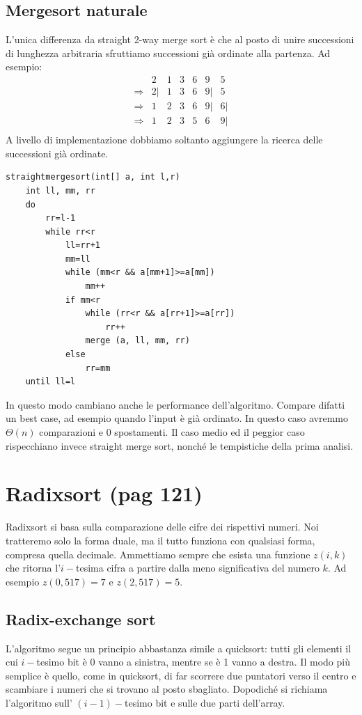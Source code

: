 \documentclass[a4paper]{book}
\newcommand{\lstIndent}{4}
\begin{document}
\subsection*{Mergesort naturale}
L'unica differenza da straight 2-way merge sort è che al posto di unire successioni di lunghezza arbitraria sfruttiamo successioni già ordinate alla partenza. Ad esempio:
\[\begin{array}{*{20}{c}}
{}&{2}&1&{3}&{6}&9&5\\
{\Rightarrow}&{2|}&{1}&{3}&{6}&{9|}&{5}\\
{\Rightarrow}&1&{2}&{3}&{6}&{9|}&{6|}\\
{\Rightarrow}&1&{2}&{3}&5&{6}&{9|}\\
\end{array}\]
A livello di implementazione dobbiamo soltanto aggiungere la ricerca delle successioni già ordinate.
\begin{lstlisting}[tabsize=\lstIndent]
straightmergesort(int[] a, int l,r)
	int ll, mm, rr
	do
		rr=l-1
		while rr<r
			ll=rr+1
			mm=ll	
			while (mm<r && a[mm+1]>=a[mm])
				mm++
			if mm<r
				while (rr<r && a[rr+1]>=a[rr])
					rr++
				merge (a, ll, mm, rr)
			else
				rr=mm
	until ll=l								
\end{lstlisting}
In questo modo cambiano anche le performance dell'algoritmo. Compare difatti un best case, ad esempio quando l'input è già ordinato. In questo caso avremmo $\Theta (n)$ comparazioni e 0 spostamenti. Il caso medio ed il peggior caso rispecchiano invece straight merge sort, nonché le tempistiche della prima analisi.
\section{Radixsort (pag 121)}
Radixsort si basa sulla comparazione delle cifre dei rispettivi numeri. Noi tratteremo solo la forma duale, ma il tutto funziona con qualsiasi forma, compresa quella decimale. Ammettiamo sempre che esista una funzione $z(i,k)$ che ritorna l'$i-$tesima cifra a partire dalla meno significativa del numero $k$. Ad esempio $z(0,517)=7$ e $z(2, 517)=5$.
\subsection{Radix-exchange sort}
L'algoritmo segue un principio abbastanza simile a quicksort: tutti gli elementi il cui $i-$tesimo bit è 0 vanno a sinistra, mentre se è 1 vanno a destra. Il modo più semplice è quello, come in quicksort, di far scorrere due puntatori verso il centro e scambiare i numeri che si trovano al posto sbagliato. Dopodiché si richiama l'algoritmo sull' $(i-1)-$tesimo bit e sulle due parti dell'array.
\end{document}
